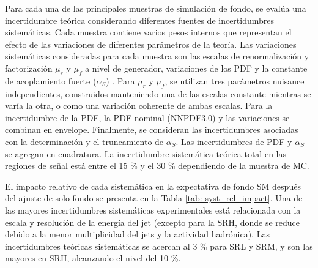Para cada una de las principales muestras de simulación de fondo, se evalúa una incertidumbre teórica considerando diferentes fuentes de incertidumbres sistemáticas. Cada muestra
contiene varios pesos internos que representan el efecto de las variaciones de diferentes parámetros de la teoría. Las variaciones sistemáticas consideradas
para cada muestra son las escalas de renormalización y factorización $\mu_{r}$ y $\mu_{f}$ a nivel de generador, variaciones de los PDF \cite{Butterworth: 2015oua} y la constante de acoplamiento fuerte ($\alpha_S$) .
Para $\mu_{r}$ y $\mu_{f}$, se utilizan tres parámetros nuisance independientes, construidos manteniendo una de las escalas constante mientras se varía la otra, o como una variación coherente de ambas escalas.
Para la incertidumbre de la PDF, la PDF nominal (NNPDF3.0) y las variaciones se combinan en envelope. Finalmente, se consideran las incertidumbres asociadas con la determinación y el truncamiento de $\alpha_S$. Las incertidumbres de PDF y $\alpha_S$ se agregan en cuadratura. La incertidumbre sistemática teórica total en las regiones de señal está entre el 15 \% y el 30 \% dependiendo de la muestra de MC.

El impacto relativo de cada sistemática en la expectativa de fondo SM después del ajuste de solo fondo se presenta en la Tabla \ref{tab: syst_rel_impact}. Una de las mayores incertidumbres sistemáticas experimentales está relacionada con la escala y resolución de la energía del jet (excepto para la SRH, donde se reduce debido a la menor multiplicidad del jets y la actividad hadrónica). Las incertidumbres teóricas sistemáticas se acercan al 3 \% para SRL y SRM, y son las mayores en SRH, alcanzando el nivel del 10 \%.


